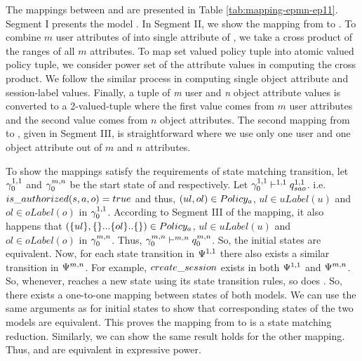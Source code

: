 The mappings between \EPMNModel{} and \EPOneOneModels{} are presented in Table \ref{tab:mapping-epmn-ep11}. Segment I  presents the \EPOneOneModels{} model \cite{labac}. In  Segment II, we show the mapping from  \EPMNModel{} to \EPOneOneModels{}.  To combine $m$ user attributes of \EPMNModel{} into single attribute  of \EPOneOneModels{}, we take a cross product of the ranges of all $m$ attributes. To map set valued policy tuple into atomic valued policy tuple, we consider power set of the attribute values in computing the cross product.  We follow the similar process in computing single object attribute  and session-label values.  Finally, a tuple of \textit{m} user and \textit{n} object attribute values is converted to a 2-valued-tuple where the first value comes from $m$ user attributes and the second value comes from $n$ object attributes. The second mapping from \EPOneOneModels{} to \EPMNModel{}, given in Segment III, is straightforward where we use only one user and one object attribute out of $m$ and $n$ attributes. 



To show the mappings satisfy the requirements of state matching transition, let $\gamma_{0}^{1,1}$ and $\gamma_{0}^{m,n}$ be the start state of \EPOneOneModels{} and \EPMNModel{}  respectively. Let $\gamma_{0}^{1,1} \vdash^{1,1} q_{sao}^{1,1}$. i.e. $ is\_authorized(s,a,o) = true$ and thus, $(ul,ol) \in Policy_a$, $ul \in uLabel(u)$ and  $ol \in oLabel(o)$ in $\gamma_{0}^{1,1}$. According to Segment III of the mapping, it also happens that $(\{ul\},\{\}... \{ol\}.. \{\}) \in Policy_a$, $ul \in uLabel(u)$ and  $ol \in oLabel(o)$ in $\gamma_{0}^{m,n}$. Thus, $\gamma_{0}^{m,n} \vdash^{m,n} q_{0}^{m,n}$. So, the initial states are equivalent. Now, for each state transition in $\Psi^{1,1}$ there also exists a similar transition in $\Psi^{m,n}$. For example, $create\_session$ exists in both $\Psi^{1,1}$ and $\Psi^{m,n}$. So, whenever, \EPOneOneModels{} reaches a new state using its state transition rules, so does \EPMNModel{}. So, there exists a one-to-one mapping between states of both models. We can use the same arguments as for initial states to show that corresponding states of the two models are equivalent. This proves the mapping from \EPOneOneModels{} to \EPMNModel{} is a state matching reduction. Similarly, we can show the same result holds for the other mapping. Thus, \EPOneOneModels{} and \EPMNModel{} are equivalent in expressive power.




